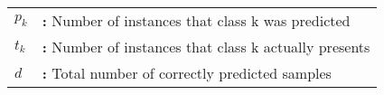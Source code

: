 \begin{tabular}{@{}p{2cm}l}
{\bf{$p_k$}} & {\bf:} Number of instances that class k was predicted\\
{\bf{$t_k$}} & {\bf:} Number of instances that class k actually presents\\
{\bf{$d$}} & {\bf:} Total number of correctly predicted samples\\
\end{tabular}

